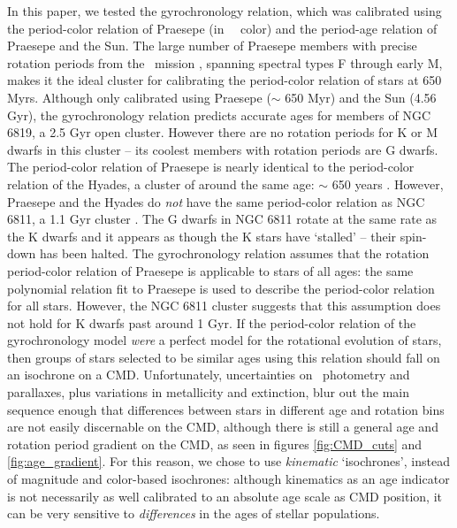 
In this paper, we tested the \citet{angus2019} gyrochronology relation, which
was calibrated using the period-color relation of Praesepe (in \gaia\ \gcolor\
color) and the period-age relation of Praesepe and the Sun.
The large number of Praesepe members with precise rotation periods from the
\ktwo\ mission \citep{douglas2017, rebull2017}, spanning spectral types F
through early M, makes it the ideal cluster for calibrating the period-color
relation of stars at 650 Myrs.
Although only calibrated using Praesepe ($\sim$ 650 Myr) and the Sun (4.56
Gyr), the \citet{angus2019} gyrochronology relation predicts accurate ages for
members of NGC 6819, a 2.5 Gyr open cluster.
However there are no rotation periods for K or M dwarfs in this cluster -- its
coolest members with rotation periods are G dwarfs.
The period-color relation of Praesepe is nearly identical to the period-color
relation of the Hyades, a cluster of around the same age: $\sim$ 650 years
\citep{douglas2016, douglas2017, rebull2017}.
However, Praesepe and the Hyades do {\it not} have the same period-color
relation as NGC 6811, a 1.1 Gyr cluster \citep{curtis2019}.
The G dwarfs in NGC 6811 rotate at the same rate as the K dwarfs and it
appears as though the K stars have `stalled' -- their spin-down has been
halted.
The \citet{angus2019} gyrochronology relation assumes that the rotation
period-color relation of Praesepe is applicable to stars of all ages: the same
polynomial relation fit to Praesepe is used to describe the period-color
relation for all stars.
However, the NGC 6811 cluster suggests that this assumption does not hold for
K dwarfs past around 1 Gyr.
If the period-color relation of the \citet{angus2019} gyrochronology model
{\it were} a perfect model for the rotational evolution of stars, then groups
of stars selected to be similar ages using this relation should fall on an
isochrone on a CMD.
Unfortunately, uncertainties on \gaia\ photometry and parallaxes, plus
variations in metallicity and extinction, blur out the main sequence enough
that differences between stars in different age and rotation bins are not
easily discernable on the CMD, although there is still a general age and
rotation period gradient on the CMD, as seen in figures \ref{fig:CMD_cuts} and
\ref{fig:age_gradient}.
For this reason, we chose to use {\it kinematic} `isochrones', instead of
magnitude and color-based isochrones: although kinematics as an age indicator
is not necessarily as well calibrated to an absolute age scale as CMD
position, it can be very sensitive to {\it differences} in the ages of stellar
populations.

